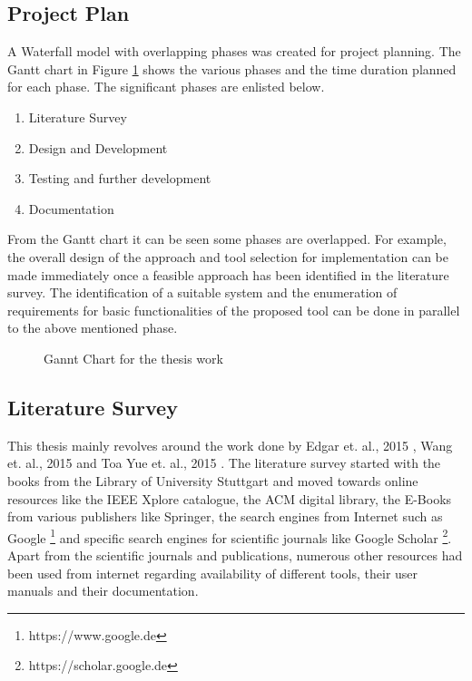 \subsection{Project Plan}
A Waterfall model with overlapping phases was created for project planning. The Gantt chart in Figure \ref{fig:gc} shows the various phases and the time duration planned for each phase. 
The significant phases are enlisted below.
\begin{enumerate}
\item Literature Survey
\item Design and Development
\item Testing and further development
\item Documentation
\end{enumerate}
From the Gantt chart it can be seen some phases are overlapped. For example, the overall design of the approach and tool selection for implementation can be made immediately once a feasible approach has been identified in the literature survey. The identification of a suitable system and the enumeration of requirements for basic functionalities of the proposed tool can be done in parallel to the above mentioned phase.
\begin{figure}[htb!]
\centering
{}
\caption{Gannt Chart for the thesis work}
\label{fig:gc}
\end{figure}
\subsection{Literature Survey}
This thesis mainly revolves around the work done by Edgar et. al., 2015 \cite{sarmiento2015mapping}, Wang et. al., 2015 \cite{wang2015automatic} and Toa Yue et. al., 2015 \cite{yue2015rtcm}. The literature survey started with the books from the Library of University Stuttgart and moved towards online resources like the IEEE Xplore catalogue, the ACM digital library, the E-Books from various publishers like Springer, the search engines from Internet such as Google \footnote{https://www.google.de} and specific search engines for scientific journals like Google Scholar \footnote{https://scholar.google.de}. Apart from the scientific journals and publications, numerous other resources had been used from internet regarding availability of different tools, their user manuals and their documentation.
